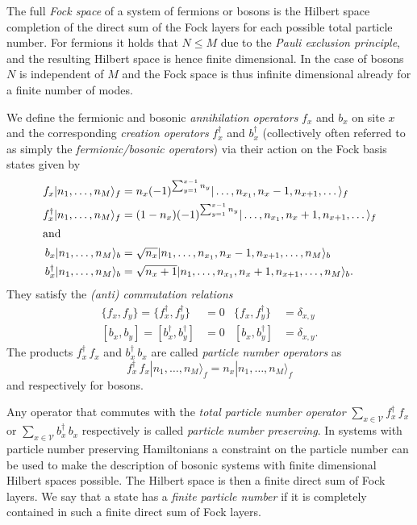 \documentclass[a4paper,12pt,listof=totoc,index=totoc,bibliography=totoc,headsepline=false,headings=normal,BCOR16.153846mm,DIV12,headinclude,twoside,cleardoublepage=empty,numbers=noenddot,final]{scrreprt}
\theoremstyle{mystyle}
\numberwithin{equation}{section}
\numberwithin{figure}{section}
\numberwithin{lemma}{section}
\numberwithin{theorem}{section}
\numberwithin{corollary}{section}
\numberwithin{definition}{section}
\numberwithin{conjecture}{section}
\numberwithin{observation}{section}
\newcommand{\+}{\mkern2mu}
\newcommand{\Vset}{\mathcal{V}}
\newcommand{\ket}[1]{|#1\rangle}
\newcommand{\ad}{^\dagger}
\DeclareMathOperator{\1}{\mathds{1}}
\begin{document}
The full \emph{Fock space} of a system of fermions or bosons is the Hilbert space completion of the direct sum of the Fock layers for each possible total particle number.
For fermions it holds that $N \leq M$ due to the \emph{Pauli exclusion principle}, and the resulting Hilbert space is hence finite dimensional. 
In the case of bosons $N$ is independent of $M$ and the Fock space is thus infinite dimensional already for a finite number of modes.

We define the fermionic and bosonic \emph{annihilation operators} $f_x$ and $b_x$ on site $x$ and the corresponding \emph{creation operators} $f\ad_x$ and $b\ad_x$ (collectively often referred to as simply the \emph{fermionic/bosonic operators}) via their action on the Fock basis states given by
\begin{align}
  f_x \ket{n_1,\dots,n_M}_f &=  n_x (-1)^{\sum_{y=1}^{x-1} n_y} \ket{\dots,n_{x_1},n_x - 1,n_{x+1},\dots}_f \label{eq:fermionicannihilationoperator}\\
  f\ad_x \ket{n_1,\dots,n_M}_f &=  (1-n_x) (-1)^{\sum_{y=1}^{x-1} n_y} \ket{\dots,n_{x_1},n_x + 1,n_{x+1},\dots}_f \\
  \intertext{and}
  b_x \ket{n_1,\dots,n_M}_b &=  \sqrt{n_x} \ket{n_1,\dots,n_{x_1},n_x - 1,n_{x+1},\dots,n_M}_b \label{eq:bosonicannihilationoperator}\\
  b\ad_x \ket{n_1,\dots,n_M}_b &=  \sqrt{n_x+1} \ket{n_1,\dots,n_{x_1},n_x + 1,n_{x+1},\dots,n_M}_b .
\end{align}
They satisfy the \emph{(anti) commutation relations}
\begin{align}
  \{f_x,f_y\} = \{f\ad_x,f\ad_y\} &= 0 & \{f_x,f\ad_y\} &= \delta_{x,y} \\
  [b_x,b_y] = [b\ad_x,b\ad_y] &= 0 & [b_x,b\ad_y] &= \delta_{x,y} . \label{eq:bosonicommutationrelations}
\end{align}
The products $f\ad_x\,f_x$ and $b\ad_x\,b_x$ are called \emph{particle number operators} as 
\begin{equation}
  f\ad_x\,f_x \ket{n_1,\dots,n_M}_f = n_x \ket{n_1,\dots,n_M}_f
\end{equation}
and respectively for bosons.

Any operator that commutes with the \emph{total particle number operator} $\sum_{x\in\Vset} f\ad_x\,f_x$ or $\sum_{x\in\Vset}  b\ad_x\,b_x$ respectively is called \emph{particle number preserving}.
In systems with particle number preserving Hamiltonians a constraint on the particle number can be used to make the description of bosonic systems with finite dimensional Hilbert spaces possible.
The Hilbert space is then a finite direct sum of Fock layers. 
We say that a state has a \emph{finite particle number} if it is completely contained in such a finite direct sum of Fock layers.
\end{document}
